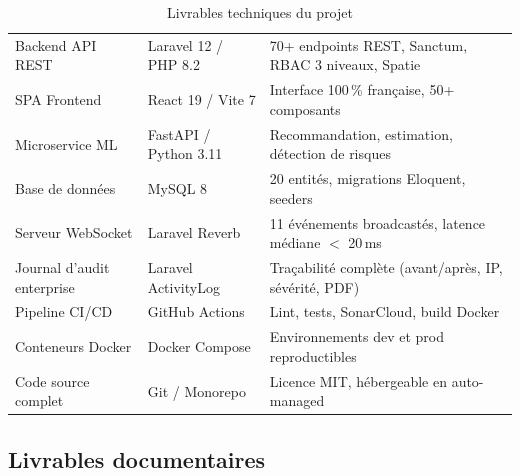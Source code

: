 \begin{table}[H]
  \centering
  \caption{Livrables techniques du projet}
  \label{tab:livrables_techniques}
  \begin{tabularx}{\textwidth}{L{5cm}L{4cm}X}
    \toprule
     &  &  \\
    \midrule
    Backend API REST         & Laravel 12 / PHP 8.2  & 70+ endpoints REST, Sanctum, RBAC 3 niveaux, Spatie \\
    SPA Frontend             & React 19 / Vite 7     & Interface 100\,\% française, 50+ composants \\
    Microservice ML          & FastAPI / Python 3.11 & Recommandation, estimation, détection de risques \\
    Base de données          & MySQL 8               & 20 entités, migrations Eloquent, seeders \\
    Serveur WebSocket        & Laravel Reverb        & 11 événements broadcastés, latence médiane $<$ 20\,ms \\
    Journal d'audit enterprise & Laravel ActivityLog & Traçabilité complète (avant/après, IP, sévérité, PDF) \\
    Pipeline CI/CD           & GitHub Actions        & Lint, tests, SonarCloud, build Docker \\
    Conteneurs Docker        & Docker Compose        & Environnements dev et prod reproductibles \\
    Code source complet      & Git / Monorepo        & Licence MIT, hébergeable en auto-managed \\
    \bottomrule
  \end{tabularx}
\end{table}

\subsection{Livrables documentaires}

